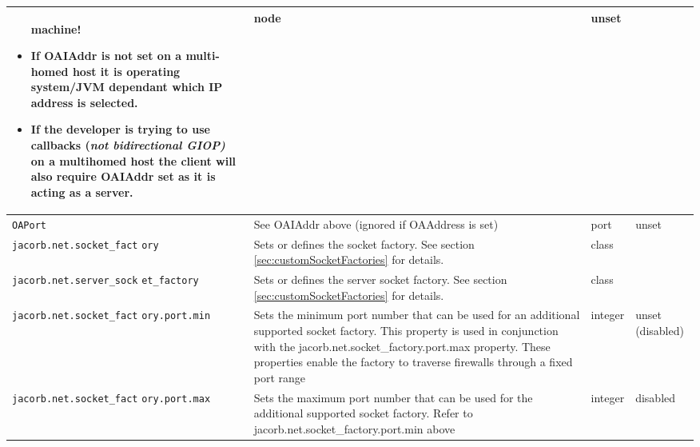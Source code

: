 \begin{small}
\begin{longtable}{|p{5cm}|p{7.5cm}|p{1.5cm}|p{1.5cm}|}
\begin{itemize}
machine!
\item If OAIAddr is not set on a multi-homed host it is operating system/JVM
dependant which IP address is selected.
\item If the developer is trying to use callbacks (\textit{not\textit{ bidirectional
GIOP)}} on a multihomed host the client
will also require OAIAddr set as it is acting as a server.
\end{itemize}
  & node & unset \\
\hline
\verb"OAPort" & See OAIAddr above (ignored if OAAddress is set) & port & unset \\
\hline
\verb"jacorb.net.socket_fact"
\verb"ory" & Sets or defines the socket factory. See section \ref{sec:customSocketFactories} for details.& class & \\
\hline
\verb"jacorb.net.server_sock"
\verb"et_factory" & Sets or defines the server socket factory. See section \ref{sec:customSocketFactories} for details.& class & \\
\hline
\verb"jacorb.net.socket_fact"
\verb"ory.port.min" & Sets the minimum port number that can be used
for an additional supported socket factory. This property is used in
conjunction with the jacorb.net.socket\_factory.port.max
property. These properties enable the factory to traverse firewalls
through a fixed port range  & integer & unset (disabled) \\
\hline
\verb"jacorb.net.socket_fact"
\verb"ory.port.max" & Sets the maximum port number that can be used
for the additional supported socket factory. Refer to
jacorb.net.socket\_factory.port.min above & integer & disabled\\
\hline
\end{longtable}
\end{small}

